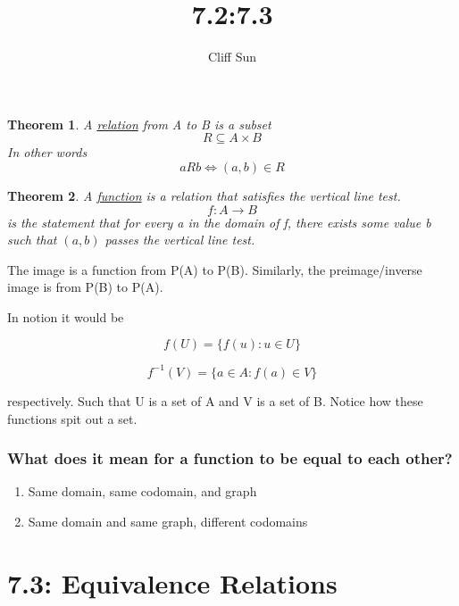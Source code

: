 \documentclass{article}
\title{7.2:7.3}
\author{Cliff Sun}
\newtheorem{theorem}{Theorem}[section]
\begin{document}
\maketitle

\begin{theorem}
    A \underline{relation} from A to B is a subset 
    \begin{equation}
        R \subseteq A \times B
    \end{equation}
    In other words
    \begin{equation}
        a R b \iff (a,b) \in R
    \end{equation}
\end{theorem}

\begin{theorem}
    A \underline{function} is a relation that satisfies the vertical line test. 
    \begin{equation}
        f: A \rightarrow B
    \end{equation}
    is the statement that for every a in the domain of f, there exists some value b such that $(a,b)$ passes the vertical line test.
\end{theorem}

The image is a function from P(A) to P(B). Similarly, the preimage/inverse image is from P(B) to P(A).

In notion it would be 

\begin{equation}
    f(U) = \{f(u): u \in U\}
\end{equation}

\begin{equation}
    f^{-1}(V) = \{a \in A: f(a) \in V\}
\end{equation}

respectively. Such that U is a set of A and V is a set of B. Notice how these functions spit out a set. 

\subsubsection*{What does it mean for a function to be equal to each other?}

\begin{enumerate}
    \item Same domain, same codomain, and graph
    \item Same domain and same graph, different codomains
\end{enumerate}

\section*{7.3: Equivalence Relations}
\end{document}
